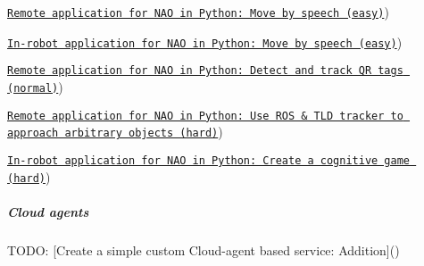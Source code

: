 \begin{DoxyItemize}
\item \href{https://github.com/rapp-project/rapp-platform/wiki/Create-a-remote-robotic-application-for-NAO-in-Python-(novice}{\tt Remote application for N\-A\-O in Python\-: Move by speech (easy)})
\item \href{https://github.com/rapp-project/rapp-platform/wiki/Create-an-in-robot-application-for-NAO-in-Python-(novice}{\tt In-\/robot application for N\-A\-O in Python\-: Move by speech (easy)})
\item \href{https://github.com/rapp-project/rapp-platform/wiki/Remote-application-for-NAO-in-Python:-Detect-and-track-QR-tags-(normal}{\tt Remote application for N\-A\-O in Python\-: Detect and track Q\-R tags (normal)})
\item \href{https://github.com/rapp-project/rapp-platform/wiki/Remote-application-for-NAO-in-Python:-Use-ROS-&-TLD-tracker-to-approach-arbitrary-objects-(hard}{\tt Remote application for N\-A\-O in Python\-: Use R\-O\-S \& T\-L\-D tracker to approach arbitrary objects (hard)})
\item \href{https://github.com/rapp-project/rapp-platform/wiki/In-robot-application-for-NAO-in-Python:-Create-a-cognitive-game-(hard}{\tt In-\/robot application for N\-A\-O in Python\-: Create a cognitive game (hard)})
\end{DoxyItemize}

\subparagraph*{Cloud agents}


\begin{DoxyItemize}
\item T\-O\-D\-O\-: \mbox{[}Create a simple custom Cloud-\/agent based service\-: Addition\mbox{]}() 
\end{DoxyItemize}